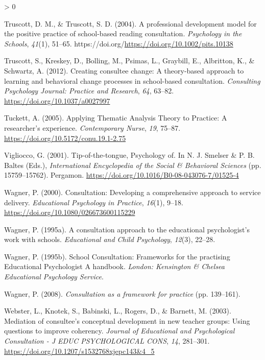 \documentclass[
  english,
  man,floatsintext]{apa6}
\newlength{\cslhangindent}
\newenvironment{CSLReferences}[2] %
 {%
  \setlength{\parindent}{0pt}
  \ifodd #1 \everypar{\setlength{\hangindent}{\cslhangindent}}\ignorespaces\fi
  \ifnum #2 > 0
  \setlength{\parskip}{#2\baselineskip}
  \fi
 }%
 {}
\begin{document}
\begin{CSLReferences}{1}{0}
\leavevmode\hypertarget{ref-truscottProfessionalDevelopmentModel2004}{}%
Truscott, D. M., \& Truscott, S. D. (2004). A professional development model for the positive practice of school-based reading consultation. \emph{Psychology in the Schools}, \emph{41}(1), 51--65. https://doi.org/\url{https://doi.org/10.1002/pits.10138}

\leavevmode\hypertarget{ref-truscottCreatingConsulteeChange2012}{}%
Truscott, S., Kreskey, D., Bolling, M., Psimas, L., Graybill, E., Albritton, K., \& Schwartz, A. (2012). Creating consultee change: A theory-based approach to learning and behavioral change processes in school-based consultation. \emph{Consulting Psychology Journal: Practice and Research}, \emph{64}, 63--82. \url{https://doi.org/10.1037/a0027997}

\leavevmode\hypertarget{ref-tuckettApplyingThematicAnalysis2005}{}%
Tuckett, A. (2005). Applying {Thematic Analysis Theory} to {Practice}: A researcher's experience. \emph{Contemporary Nurse}, \emph{19}, 75--87. \url{https://doi.org/10.5172/conu.19.1-2.75}

\leavevmode\hypertarget{ref-viglioccoTipofthetonguePsychology2001}{}%
Vigliocco, G. (2001). Tip-of-the-tongue, {Psychology} of. In N. J. Smelser \& P. B. Baltes (Eds.), \emph{International {Encyclopedia} of the {Social} \& {Behavioral Sciences}} (pp. 15759--15762). {Pergamon}. \url{https://doi.org/10.1016/B0-08-043076-7/01525-4}

\leavevmode\hypertarget{ref-wagnerConsultationDevelopingComprehensive2000}{}%
Wagner, P. (2000). Consultation: {Developing} a comprehensive approach to service delivery. \emph{Educational Psychology in Practice}, \emph{16}(1), 9--18. \url{https://doi.org/10.1080/026673600115229}

\leavevmode\hypertarget{ref-wagnerConsultationApproachEducational1995}{}%
Wagner, P. (1995a). A consultation approach to the educational psychologist's work with schools. \emph{Educational and Child Psychology}, \emph{12}(3), 22--28.

\leavevmode\hypertarget{ref-wagnerSchoolConsultationFrameworks1995}{}%
Wagner, P. (1995b). School {Consultation}: Frameworks for the practising {Educational Psychologist A} handbook. \emph{London: Kensington \& Chelsea Educational Psychology Service}.

\leavevmode\hypertarget{ref-wagnerConsultationFrameworkPractice2008}{}%
Wagner, P. (2008). \emph{Consultation as a framework for practice} (pp. 139--161).

\leavevmode\hypertarget{ref-websterMediationConsulteeConceptual2003}{}%
Webster, L., Knotek, S., Babinski, L., Rogers, D., \& Barnett, M. (2003). Mediation of consultee's conceptual development in new teacher groups: Using questions to improve coherency. \emph{Journal of Educational and Psychological Consultation - J EDUC PSYCHOLOGICAL CONS}, \emph{14}, 281--301. \url{https://doi.org/10.1207/s1532768xjepc143\&4_5}


\end{CSLReferences}
\end{document}
